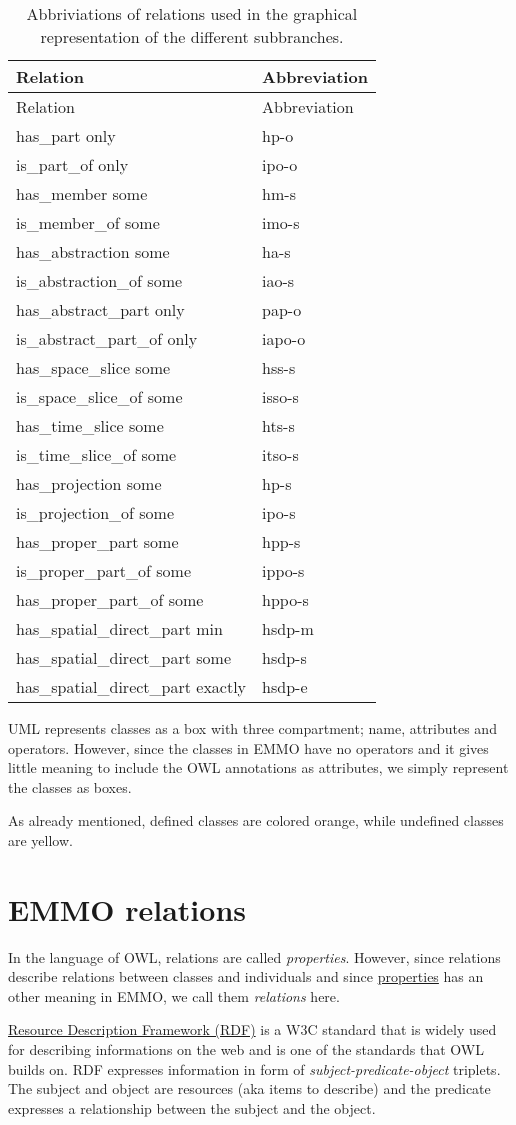 \documentclass[a4paper,]{report}
\begin{document}
\begin{longtable}[]{@{}ll@{}}
\caption{Abbriviations of relations used in the graphical representation
of the different subbranches.}\tabularnewline
\toprule
Relation & Abbreviation\tabularnewline
\midrule
\endfirsthead
\toprule
Relation & Abbreviation\tabularnewline
\midrule
\endhead
has\_part only & hp-o\tabularnewline
is\_part\_of only & ipo-o\tabularnewline
has\_member some & hm-s\tabularnewline
is\_member\_of some & imo-s\tabularnewline
has\_abstraction some & ha-s\tabularnewline
is\_abstraction\_of some & iao-s\tabularnewline
has\_abstract\_part only & pap-o\tabularnewline
is\_abstract\_part\_of only & iapo-o\tabularnewline
has\_space\_slice some & hss-s\tabularnewline
is\_space\_slice\_of some & isso-s\tabularnewline
has\_time\_slice some & hts-s\tabularnewline
is\_time\_slice\_of some & itso-s\tabularnewline
has\_projection some & hp-s\tabularnewline
is\_projection\_of some & ipo-s\tabularnewline
has\_proper\_part some & hpp-s\tabularnewline
is\_proper\_part\_of some & ippo-s\tabularnewline
has\_proper\_part\_of some & hppo-s\tabularnewline
has\_spatial\_direct\_part min & hsdp-m\tabularnewline
has\_spatial\_direct\_part some & hsdp-s\tabularnewline
has\_spatial\_direct\_part exactly & hsdp-e\tabularnewline
\bottomrule
\end{longtable}

UML represents classes as a box with three compartment; name, attributes
and operators. However, since the classes in EMMO have no operators and
it gives little meaning to include the OWL annotations as attributes, we
simply represent the classes as boxes.

As already mentioned, defined classes are colored orange, while
undefined classes are yellow.

\hypertarget{emmo-relations}{%
\chapter{EMMO relations}\label{emmo-relations}}

In the language of OWL, relations are called \emph{properties}. However,
since relations describe relations between classes and individuals and
since \protect\hyperlink{Properties}{properties} has an other meaning in
EMMO, we call them \emph{relations} here.

\href{https://en.wikipedia.org/wiki/Resource_Description_Framework}{Resource
Description Framework (RDF)} is a W3C standard that is widely used for
describing informations on the web and is one of the standards that OWL
builds on. RDF expresses information in form of
\emph{subject-predicate-object} triplets. The subject and object are
resources (aka items to describe) and the predicate expresses a
relationship between the subject and the object.
\end{document}
